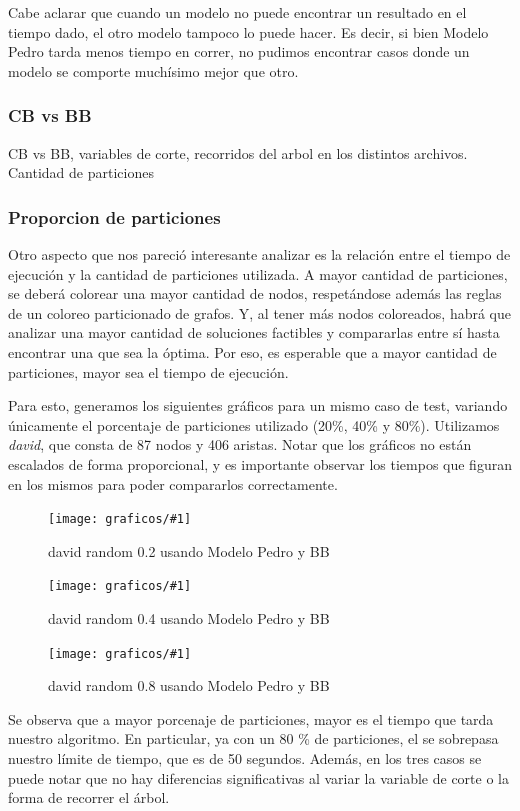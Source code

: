 \documentclass[a4paper, 10pt, twoside]{article}
\newcommand{\diagramavfig}[2]{%
  \begin{figure}[H]
    \texttt{[image: graficos/\#1]}%
    \caption{#2}
    \label{fig:#1}
  \end{figure}
}
\begin{document}
Cabe aclarar que cuando un modelo no puede encontrar un resultado en el tiempo dado, el otro modelo tampoco lo puede hacer. Es decir, si bien Modelo Pedro tarda menos tiempo en correr, no pudimos encontrar casos donde un modelo se comporte muchísimo mejor que otro.

\subsubsection{CB vs BB}

CB vs BB, variables de corte, recorridos del arbol en los distintos archivos. Cantidad de particiones



\subsubsection{Proporcion de particiones}
Otro aspecto que nos pareció interesante analizar es la relación entre el tiempo de ejecución y la cantidad de particiones utilizada. A mayor cantidad de particiones, se deberá colorear una mayor cantidad de nodos, respetándose además las reglas de un coloreo particionado de grafos. Y, al tener más nodos coloreados, habrá que analizar una mayor cantidad de soluciones factibles y compararlas entre sí hasta encontrar una que sea la óptima. Por eso, es esperable que a mayor cantidad de particiones, mayor sea el tiempo de ejecución.

Para esto, generamos los siguientes gráficos para un mismo caso de test, variando únicamente el porcentaje de particiones utilizado (20\%, 40\% y 80\%). Utilizamos \emph{david}, que consta de 87 nodos y 406 aristas. Notar que los gráficos no están escalados de forma proporcional, y es importante observar los tiempos que figuran en los mismos para poder compararlos correctamente.

\diagramavfig{david_random_0.2_bb_0_segunJuntada}{david random 0.2 usando Modelo Pedro y BB}
\diagramavfig{david_random_0.4_bb_0_segunJuntada}{david random 0.4 usando Modelo Pedro y BB}
\diagramavfig{david_random_0.8_bb_0_segunJuntada}{david random 0.8 usando Modelo Pedro y BB}

Se observa que a mayor porcenaje de particiones, mayor es el tiempo que tarda nuestro algoritmo. En particular, ya con un 80 \% de particiones, el se sobrepasa nuestro límite de tiempo, que es de 50 segundos. Además, en los tres casos se puede notar que no hay diferencias significativas al variar la variable de corte o la forma de recorrer el árbol.
\end{document}
